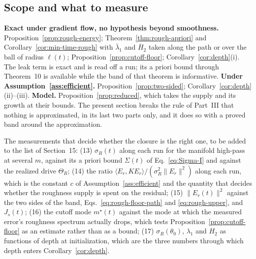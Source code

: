 \subsection{Scope and what to measure}

\textbf{Exact under gradient flow, no hypothesis beyond smoothness.}
Proposition~\ref{prop:rough-energy}; Theorem~\ref{thm:rough-apriori} and
Corollary~\ref{cor:min-time-rough} with $\bar\lambda_1$ and $\bar H_2$ taken
along the path or over the ball of radius $\ell(t)$;
Proposition~\ref{prop:cutoff-floor}; Corollary~\ref{cor:depth}(i).
The leak term is exact and is read off a run; its a priori bound through
Theorem~10 is available while the band of that theorem is informative.
\textbf{Under Assumption~\ref{ass:efficient}.} Proposition~\ref{prop:two-sided};
Corollary~\ref{cor:depth}(ii)--(iii). \textbf{Model.}
Proposition~\ref{prop:reduced}, which takes the supply and its growth at their
bounds. The present section breaks the rule of Part~III that nothing is
approximated, in its last two parts only, and it does so with a proved band
around the approximation.

The measurements that decide whether the closure is the right one, to be added
to the list of Section~15: (13) $\sigma_R(t)$ along each run for the
manifold high-pass at several $m$, against its a priori bound $\Sigma(t)$ of
Eq.~\eqref{eq:Sigma-I} and against the realized drive $\Theta_R$;
(14) the ratio $\langle E_r,KE_r\rangle/(\sigma_R^2\|E_r\|^2)$ along each run,
which is the constant $c$ of Assumption~\ref{ass:efficient} and the quantity
that decides whether the roughness supply is spent on the residual;
(15) $\|E_r(t)\|^2$ against the two sides of the band,
Eqs.~\eqref{eq:rough-floor-path} and \eqref{eq:rough-upper}, and $J_s(t)$;
(16) the cutoff mode $m^\star(t)$ against the mode at which the measured
error's roughness spectrum actually drops, which tests
Proposition~\ref{prop:cutoff-floor} as an estimate rather than as a bound;
(17) $\sigma_R(\theta_0)$, $\lambda_1$ and $H_2$ as functions of depth at
initialization, which are the three numbers through which depth enters
Corollary~\ref{cor:depth}.
